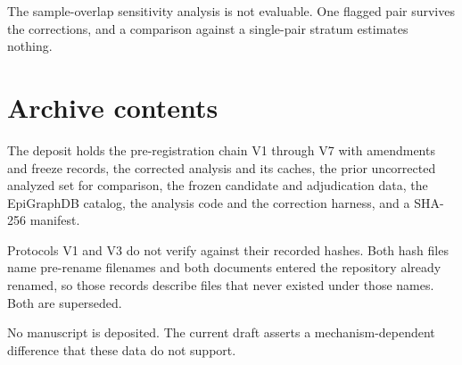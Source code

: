 \documentclass[11pt,a4paper]{article}
\begin{document}
The sample-overlap sensitivity analysis is not evaluable. One flagged pair survives the
corrections, and a comparison against a single-pair stratum estimates nothing.

\section{Archive contents}

The deposit holds the pre-registration chain V1 through V7 with amendments and freeze
records, the corrected analysis and its caches, the prior uncorrected analyzed set for
comparison, the frozen candidate and adjudication data, the EpiGraphDB catalog, the
analysis code and the correction harness, and a SHA-256 manifest.

Protocols V1 and V3 do not verify against their recorded hashes. Both hash files name
pre-rename filenames and both documents entered the repository already renamed, so those
records describe files that never existed under those names. Both are superseded.

No manuscript is deposited. The current draft asserts a mechanism-dependent difference that
these data do not support.
\end{document}

